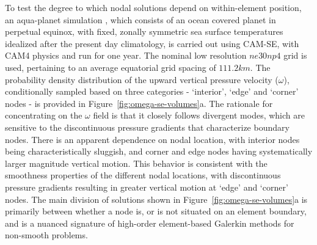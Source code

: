 \documentclass[twocol]{ametsoc}
\begin{document}
To test the degree to which nodal solutions depend on within-element position, an aqua-planet simulation \citep{NH2000ASL,MWO2016JAMES}, {\color{red}which consists of an ocean covered planet in perpetual equinox, with fixed, zonally symmetric sea surface temperatures idealized after the present day climatology,{}} is carried out using CAM-SE, with CAM4 physics \citep{CAM4} and run for one year. The nominal low resolution $ne30np4$ grid is used, pertaining to an average equatorial grid spacing of $111.2km$. The probability density distribution of the upward vertical pressure velocity ($\omega$), conditionally sampled based on three categories - `interior', `edge' and `corner' nodes - is provided in Figure~\ref{fig:omega-se-volumes}{\color{red}a. The rationale for concentrating on the $\omega$ field is that it closely follows divergent modes, which are sensitive to the discontinuous pressure gradients that characterize boundary nodes.{}} There is an apparent dependence on nodal location, with interior nodes being characteristically sluggish, and corner and edge nodes having systematically larger magnitude vertical motion. This behavior is consistent with the smoothness properties of the different nodal locations, with discontinuous pressure gradients resulting in greater vertical motion at `edge' and `corner' nodes. The main division of solutions shown in Figure~\ref{fig:omega-se-volumes}{\color{red}a{}} is primarily between whether a node is, or is not situated on an element boundary, and is a nuanced signature of high-order element-based Galerkin methods for non-smooth problems.
\end{document}
